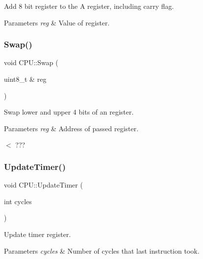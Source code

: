 Add 8 bit register to the A register, including carry flag. 


\begin{DoxyParams}{Parameters}
{\em reg} & Value of register. \\
\hline
\end{DoxyParams}
\mbox{\label{classCPU_abd96e68ea71dbec9b7e4f182d12af433}} 
\subsubsection{\texorpdfstring{Swap()}{Swap()}}
{\footnotesize\ttfamily void C\+P\+U\+::\+Swap (\begin{DoxyParamCaption}\item[{uint8\+\_\+t \&}]{reg }\end{DoxyParamCaption})\hspace{0.3cm}{\ttfamily [private]}}



Swap lower and upper 4 bits of an register. 


\begin{DoxyParams}{Parameters}
{\em reg} & Address of passed register. \\
\hline
\end{DoxyParams}
$<$ ??? \mbox{\label{classCPU_ad8eb59dff5e4fe4c1b2881cc67574ddf}} 
\subsubsection{\texorpdfstring{Update\+Timer()}{UpdateTimer()}}
{\footnotesize\ttfamily void C\+P\+U\+::\+Update\+Timer (\begin{DoxyParamCaption}\item[{int}]{cycles }\end{DoxyParamCaption})}



Update timer register. 


\begin{DoxyParams}{Parameters}
{\em cycles} & Number of cycles that last instruction took. \\
\hline
\end{DoxyParams}
\mbox{\label{classCPU_a96829391f528347bce7150c09489ee6f}} 
